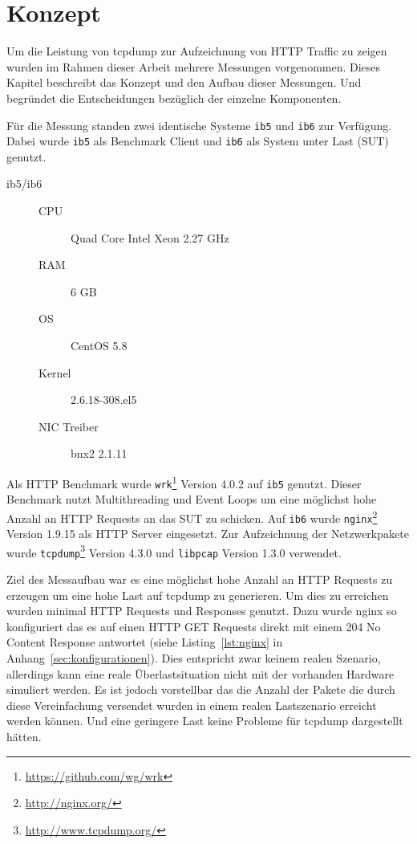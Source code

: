 \section{Konzept}
\label{sec:konzept}

Um die Leistung von tcpdump zur Aufzeichnung von HTTP Traffic zu zeigen wurden
im Rahmen dieser Arbeit mehrere Messungen vorgenommen. Dieses Kapitel beschreibt
das Konzept und den Aufbau dieser Messungen. Und begründet die Entscheidungen
bezüglich der einzelne Komponenten.

Für die Messung standen zwei identische Systeme \texttt{ib5} und \texttt{ib6}
zur Verfügung. Dabei wurde \texttt{ib5} als Benchmark Client und \texttt{ib6}
als System unter Last (SUT) genutzt.

\begin{description}
\item [ib5/ib6] \hfill
\begin{description}
\item [CPU] Quad Core Intel Xeon 2.27 GHz
\item [RAM] 6 GB
\item [OS] CentOS 5.8
\item [Kernel] 2.6.18-308.el5
\item [NIC Treiber] bnx2 2.1.11
\end{description}
\end{description}

Als HTTP Benchmark wurde \texttt{wrk}\footnote{\url{https://github.com/wg/wrk}}
Version 4.0.2 auf \texttt{ib5} genutzt. Dieser Benchmark nutzt Multithreading
und Event Loops um eine möglichst hohe Anzahl an HTTP Requests an das SUT zu
schicken. Auf \texttt{ib6} wurde
\texttt{nginx}\footnote{\url{http://nginx.org/}} Version 1.9.15 als HTTP Server
eingesetzt. Zur Aufzeichnung der Netzwerkpakete wurde
\texttt{tcpdump}\footnote{\url{http://www.tcpdump.org/}} Version 4.3.0 und
\texttt{libpcap} Version 1.3.0 verwendet.

Ziel des Messaufbau war es eine möglichst hohe Anzahl an HTTP Requests zu
erzeugen um eine hohe Last auf tcpdump zu generieren. Um dies zu erreichen
wurden minimal HTTP Requests und Responses genutzt. Dazu wurde nginx so
konfiguriert das es auf einen HTTP GET Requests direkt mit einem 204 No Content
Response antwortet (siehe Listing~\ref{lst:nginx} in
Anhang~\ref{sec:konfigurationen}).  Dies entspricht zwar keinem realen
Szenario, allerdings kann eine reale Überlastsituation nicht mit der vorhanden
Hardware simuliert werden. Es ist jedoch vorstellbar das die Anzahl der Pakete
die durch diese Vereinfachung versendet wurden in einem realen Lastszenario
erreicht werden können. Und eine geringere Last keine Probleme für tcpdump
dargestellt hätten.

